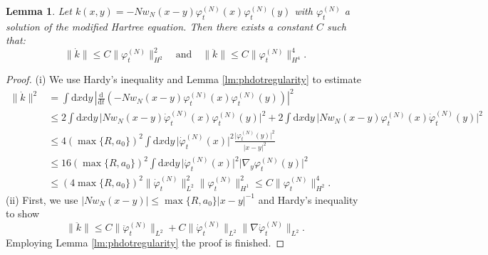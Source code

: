 \documentclass[11pt,a4paper,draft,DIV11]{scrartcl}	%
\newtheorem{lem}[thm]{Lemma}
\newcommand{\di}{\textrm{d}}		%
\newcommand{\norm}[1]{\lVert#1\rVert}	%
\newcommand{\ph}{\varphi_t^{(N)}}	%
\newcommand{\phdot}{\dot{\varphi}_t^{(N)}}	%
\newcommand{\phddot}{\ddot{\varphi}_t^{(N)}}	%
\newcommand{\bd}{\begin{displaymath}}			%
\newcommand{\ed}{\end{displaymath}}
\begin{document}
\begin{lem} \label{lm:kbounds} Let $k(x,y) = -N w_N(x-y) \ph(x) \ph(y)$ with $\ph$ a solution of the modified Hartree equation. Then there exists a constant $C$ such that:
\bd
\norm{\dot k} \leq C \norm{\ph}_{H^2}^2
 \quad \mbox{and} \quad
\norm{\ddot k} \leq C \norm{\ph}_{H^4}^4.
\ed
\end{lem}
\begin{proof} (i) We use Hardy's inequality and Lemma \ref{lm:phdotregularity} to estimate
\begin{align*}
\norm{\dot k}^2 & = \int \di x\di y\, \left\lvert \frac{\di}{\di t} \left( -N w_N(x-y) \ph(x)\ph(y) \right) \right\rvert^2 \\
& \leq 2 \int \di x\di y\, \lvert N w_N(x-y) \phdot(x) \ph(y) \rvert^2 + 2 \int \di x \di y\, \lvert N w_N(x-y) \ph(x) \phdot(y) \rvert^2 \\
& \leq 4 \left( \max\{R,a_0\} \right)^2 \int \di x\di y\, \lvert \phdot(x)\rvert^2 \frac{\lvert\ph(y)\rvert^2}{\lvert x-y\rvert^2} \\
& \leq 16 \left( \max\{R,a_0\} \right)^2 \int \di x\di y\, \lvert \phdot(x)\rvert^2 \lvert \nabla_y \ph(y)\rvert^2 \\
& \leq \left( 4 \max\{R,a_0\} \right)^2 \norm{\phdot}_{L^2}^2 \norm{\ph}_{H^1}^2 \leq C \norm{\ph}_{H^2}^4.
\end{align*}
(ii) First, we use $\lvert N w_N(x-y) \rvert \leq \max \{R,a_0\} \lvert x-y\rvert^{-1}$ and Hardy's inequality to show
\bd
\norm{\ddot k} \leq C \norm{\phddot}_{L^2} + C \norm{\phdot}_{L^2} \norm{\nabla \phdot}_{L^2}.
\ed
Employing Lemma \ref{lm:phdotregularity} the proof is finished.
\end{proof}
\end{document}
